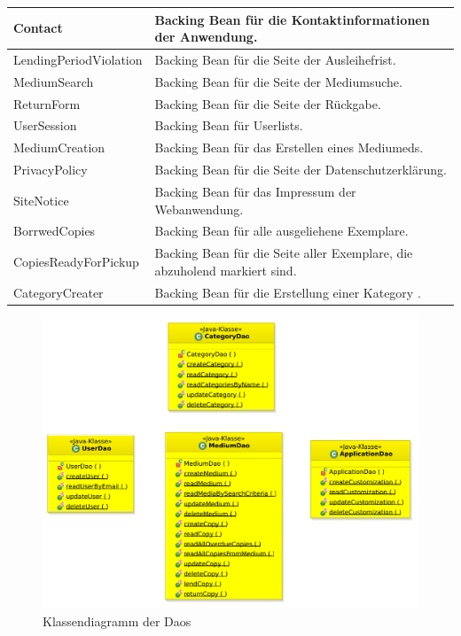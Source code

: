 \documentclass{article}
\begin{document}
\begin{center}
\begin{table}
\begin{tabular} { |p{}|p{}| }
            \hline
            Contact & Backing Bean für die Kontaktinformationen der Anwendung.\\
            \hline
            LendingPeriodViolation & Backing Bean für die Seite der Ausleihefrist.\\
            \hline
            MediumSearch & Backing Bean für die Seite der Mediumsuche.\\
            \hline
            ReturnForm & Backing Bean für die Seite der Rückgabe.\\
            \hline
            UserSession & Backing Bean für Userlists.\\
            \hline
            MediumCreation & Backing Bean für das Erstellen eines  Mediumeds.\\
            \hline
            PrivacyPolicy & Backing Bean für die Seite der Datenschutzerklärung.\\
            \hline
            SiteNotice & Backing Bean für das Impressum der  Webanwendung.\\
            \hline
            BorrwedCopies & Backing Bean für alle ausgeliehene Exemplare.\\
            \hline
            CopiesReadyForPickup & Backing Bean für die Seite aller Exemplare, die abzuholend markiert sind.\\
            \hline
            CategoryCreater & Backing Bean für die Erstellung einer Kategory .\\
            \hline
        \end{tabular}
    \end{table}
\end{center}

\begin{center}
    \begin{figure}[H]
	\hypertarget{DAOs}{}
        \includegraphics[scale=0.6]{KlassendiagrammDaos.pdf}
        \caption{Klassendiagramm der Daos  }
        \label{fig:DAO Klassendiagramm}
    \end{figure}
\end{center}
\end{document}
